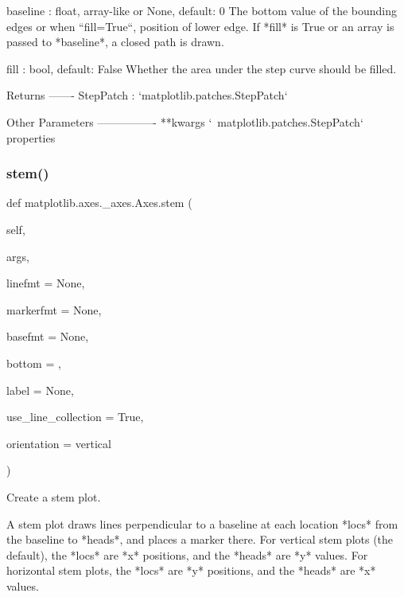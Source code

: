 \begin{DoxyVerb}
\begin{DoxyVerb}
baseline : float, array-like or None, default: 0
    The bottom value of the bounding edges or when
    ``fill=True``, position of lower edge. If *fill* is
    True or an array is passed to *baseline*, a closed
    path is drawn.

fill : bool, default: False
    Whether the area under the step curve should be filled.

Returns
-------
StepPatch : `matplotlib.patches.StepPatch`

Other Parameters
----------------
**kwargs
    `~matplotlib.patches.StepPatch` properties\end{DoxyVerb}
 \mbox{\label{classmatplotlib_1_1axes_1_1__axes_1_1Axes_a7e8bc70a757646b64956417df973f95f}} 
\subsubsection{\texorpdfstring{stem()}{stem()}}
{\footnotesize\ttfamily def matplotlib.\+axes.\+\_\+axes.\+Axes.\+stem (\begin{DoxyParamCaption}\item[{}]{self,  }\item[{}]{args,  }\item[{}]{linefmt = {\ttfamily None},  }\item[{}]{markerfmt = {\ttfamily None},  }\item[{}]{basefmt = {\ttfamily None},  }\item[{}]{bottom = {},  }\item[{}]{label = {\ttfamily None},  }\item[{}]{use\+\_\+line\+\_\+collection = {\ttfamily True},  }\item[{}]{orientation = {\ttfamily \textquotesingle{}vertical\textquotesingle{}} }\end{DoxyParamCaption})}

\begin{DoxyVerb}Create a stem plot.

A stem plot draws lines perpendicular to a baseline at each location
*locs* from the baseline to *heads*, and places a marker there. For
vertical stem plots (the default), the *locs* are *x* positions, and
the *heads* are *y* values. For horizontal stem plots, the *locs* are
*y* positions, and the *heads* are *x* values.


\end{DoxyVerb}
\end{DoxyVerb}
